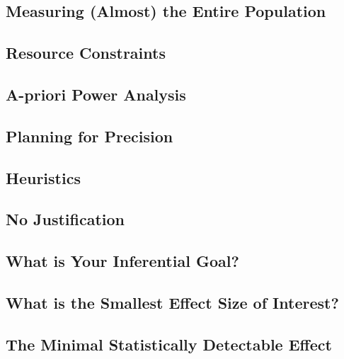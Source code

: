 \documentclass[
  oneside]{krantz}
\begin{document}
\hypertarget{measuring-almost-the-entire-population}{%
\subsection{Measuring (Almost) the Entire
Population}\label{measuring-almost-the-entire-population}}

\hypertarget{resource-constraints}{%
\subsection{Resource Constraints}\label{resource-constraints}}

\hypertarget{aprioripower}{%
\subsection{A-priori Power Analysis}\label{aprioripower}}

\hypertarget{planning-for-precision}{%
\subsection{Planning for Precision}\label{planning-for-precision}}

\hypertarget{heuristics}{%
\subsection{Heuristics}\label{heuristics}}

\hypertarget{no-justification}{%
\subsection{No Justification}\label{no-justification}}

\hypertarget{what-is-your-inferential-goal}{%
\subsection{What is Your Inferential
Goal?}\label{what-is-your-inferential-goal}}

\hypertarget{what-is-the-smallest-effect-size-of-interest}{%
\subsection{What is the Smallest Effect Size of
Interest?}\label{what-is-the-smallest-effect-size-of-interest}}

\hypertarget{minimaldetectable}{%
\subsection{The Minimal Statistically Detectable
Effect}\label{minimaldetectable}}
\end{document}
